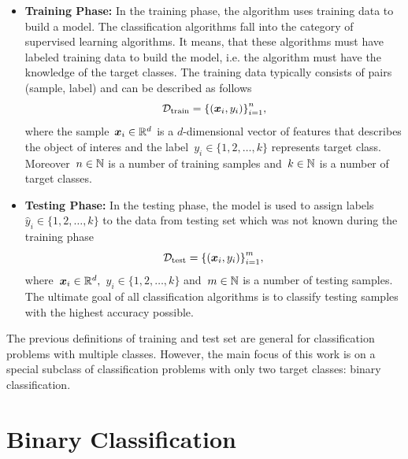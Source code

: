 \begin{itemize}
  \item \textbf{Training Phase:} In the training phase, the algorithm uses training data to build a model. The classification algorithms fall into the category of supervised learning algorithms. It means, that these algorithms must have labeled training data to build the model, i.e. the algorithm must have the knowledge of the target classes. The training data typically consists of pairs (sample, label) and can be described as follows
  \begin{equation*}\label{eq: training set}
    \mathcal{D}_{\mathrm{train}} = \Brac[c]{(\bm{x}_i, y_i)}_{i=1}^{n},
  \end{equation*}
  where the sample~$\bm{x}_i \in \mathbb{R}^d$ is a $d$-dimensional vector of features that describes the object of interes and the label~$y_i \in \{1, 2, \ldots, k\}$ represents target class. Moreover~$n \in \mathbb{N}$ is a number of training samples and~$k \in \mathbb{N}$ is a number of target classes.
  \item \textbf{Testing Phase:} In the testing phase, the model is used to assign labels~$\hat{y}_i \in \{1, 2, \ldots, k\}$ to the data from testing set which was not known during the training phase
  \begin{equation*}\label{eq: test set}
    \mathcal{D}_{\mathrm{test}} = \Brac[c]{(\bm{x}_i, y_i)}_{i=1}^{m},
  \end{equation*}
  where~$\bm{x}_i \in \mathbb{R}^d,$~$y_i \in \{1, 2, \ldots, k\}$ and~$m \in \mathbb{N}$ is a number of testing samples. The ultimate goal of all classification algorithms is to classify testing samples with the highest accuracy possible.
\end{itemize}
The previous definitions of training and test set are general for classification problems with multiple classes. However, the main focus of this work is on a special subclass of classification problems with only two target classes: binary classification.


\section{Binary Classification}

